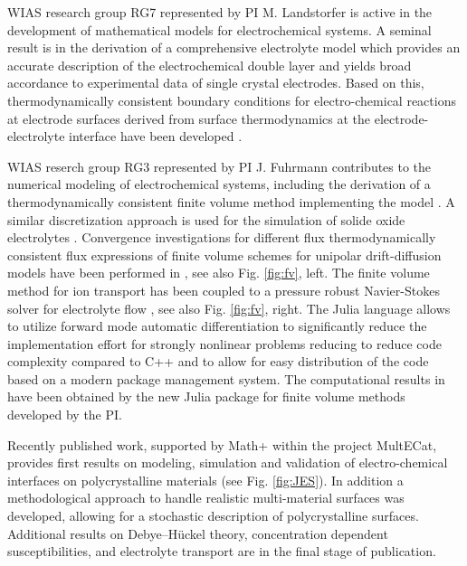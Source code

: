 \documentclass[a4paper,10pt]{article}
\begin{document}
WIAS research group  RG7 represented by PI M. Landstorfer is active
in the development of mathematical models for electrochemical systems.
A seminal result is in the derivation of a comprehensive electrolyte model 
which provides an accurate description of the electrochemical double layer and yields broad accordance to experimental data of single crystal electrodes. %
Based on this, thermodynamically consistent boundary conditions for electro-chemical reactions at electrode surfaces derived from  surface thermodynamics at the electrode-electrolyte interface have been developed \cite{DGM2013,DGL2014,Landstorfer2016187,landstorfer2017boundary}.

WIAS reserch group RG3 represented by PI J. Fuhrmann contributes to the numerical modeling of electrochemical systems,
including the derivation of a thermodynamically consistent finite volume  method \cite{JF2016} implementing
the model \cite{DGL2014}. A similar discretization approach is used for the simulation
of solide oxide electrolytes \cite{VagnerEtAl2019}. Convergence investigations for different flux
thermodynamically consistent flux expressions of  finite volume
schemes for unipolar drift-diffusion models  have been  performed in \cite{CCFG2020}, see also Fig. \ref{fig:fv}, left. The finite volume method for
ion transport has been coupled to a pressure robust Navier-Stokes solver for electrolyte flow
\cite{FGLMMSpringer2019,FuhrmannEtAlECActa2019}, see also Fig. \ref{fig:fv}, right.
The Julia language allows to utilize forward mode automatic differentiation to significantly reduce the implementation effort for strongly nonlinear problems reducing to reduce code complexity compared to C++ and to allow for easy distribution of the code based on a modern package management system.
The computational  results  in  \cite{CCFG2020,VagnerEtAl2019} have been obtained by the  new Julia package for finite volume methods \cite{VoronoiFVM} developed by the PI.



Recently published work\cite{JES}, supported by Math+ within the project MultECat, provides first results on modeling, simulation and validation of electro-chemical interfaces on polycrystalline materials (see Fig. \ref{fig:JES}). In addition a methodological approach to handle realistic multi-material surfaces was developed, allowing for a stochastic description of polycrystalline surfaces. Additional results on Debye--Hückel theory, concentration dependent susceptibilities, and electrolyte transport are in the final stage of publication. %
\end{document}
